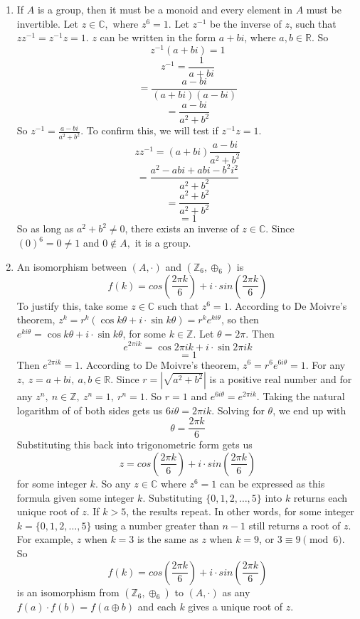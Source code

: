 \begin{enumerate}
\begin{enumerate}
        \item If \(A\) is a group, then it must be a monoid and every element in \(A\) must be invertible. Let \(z \in \mathbb{C},\) where \(z^6 = 1.\) Let \(z^{-1}\) be the inverse of \(z\), such that \(zz^{-1} = z^{-1}z = 1.\) \(z\) can be written in the form \(a+bi\), where \(a,b \in \mathbb{R}\). So
        \[z^{-1}(a+bi) = 1\]
        \[z^{-1} = \frac{1}{a+bi}\]
        \[=\frac{a-bi}{(a+bi)(a-bi)}\]
        \[=\frac{a-bi}{a^2 + b^2}\]
        So \(z^{-1} = \frac{a-bi}{a^2+b^2}\). To confirm this, we will test if \(z^{-1}z = 1\).
        \[zz^{-1} = (a+bi)\frac{a-bi}{a^2+b^2}\]
        \[=\frac{a^2 - abi + abi - b^2i^2}{a^2 + b^2}\]
        \[=\frac{a^2+b^2}{a^2+b^2}\]
        \[=1\]
        So as long as \(a^2 + b^2 \ne 0\), there exists an inverse of \(z \in \mathbb{C}\). Since \((0)^6 = 0 \ne 1\) and \( 0 \not\in A,\) it is a group.
        
        \item An isomorphism between \((A, \cdot)\) and \((\mathbb{Z}_{6}, \oplus_6)\) is 
        \[f(k) = cos\left(\frac{2\pi k}{6}\right) + i\cdot sin\left(\frac{2\pi k}{6}\right)\]
        To justify this, take some \(z \in \mathbb{C}\) such that \(z^6=1.\) According to De Moivre's theorem, \(z^k = r^k(\cos{k\theta} + i\cdot \sin{k\theta}) = r^ke^{ki\theta}\), so then \(e^{ki\theta} = \cos{k\theta} + i\cdot\sin{k\theta}\), for some \(k \in \mathbb{Z}\). Let \(\theta=2\pi.\) Then 
        \[e^{2\pi ik}=\cos{2\pi ik} + i\cdot\sin{2\pi ik}\]
        \[=1\]
        Then \(e^{2\pi ik}=1.\) According to De Moivre's theorem, \(z^6 = r^6e^{6i\theta}=1\). For any \(z,\ z=a+bi,\ a,b \in \mathbb{R}.\) Since \(r =|\sqrt{a^2 + b^2}|\) is a positive real number and for any \(z^n,\ n \in \mathbb{Z},\ z^n=1,\ r^n = 1.\) So \(r = 1\) and \(e^{6i\theta} = e^{2\pi ik}\). Taking the natural logarithm of of both sides gets us \(6i\theta = 2\pi ik\). Solving for \(\theta\), we end up with 
        \[\theta = \frac{2\pi k}{6}\]
        Substituting this back into trigonometric form gets us 
        \[z = cos\left(\frac{2\pi k}{6}\right) + i\cdot sin\left(\frac{2\pi k}{6}\right)\]
        for some integer \(k\). So any \(z \in \mathbb{C}\) where \(z^6=1\) can be expressed as this formula given some integer \(k\). Substituting \(\{0, 1, 2, \ldots, 5\}\) into \(k\) returns each unique root of \(z\). If \(k > 5\), the results repeat. In other words, for some integer \(k = \{0, 1, 2, \ldots, 5\}\) using a number greater than \(n-1\) still returns a root of \(z\). For example, \(z\) when \(k=3\) is the same as \(z\) when \(k=9\), or \(3 \equiv 9 \pmod{6}\). So 
        \[f(k) = cos\left(\frac{2\pi k}{6}\right) + i\cdot sin\left(\frac{2\pi k}{6}\right)\]
        is an isomorphism from \((\mathbb{Z}_{6}, \oplus_6)\) to \((A, \cdot)\) as any \(f(a) \cdot f(b) = f(a \oplus b)\) and each \(k\) gives a unique root of \(z\).
        
    \end{enumerate}
 \end{enumerate}


